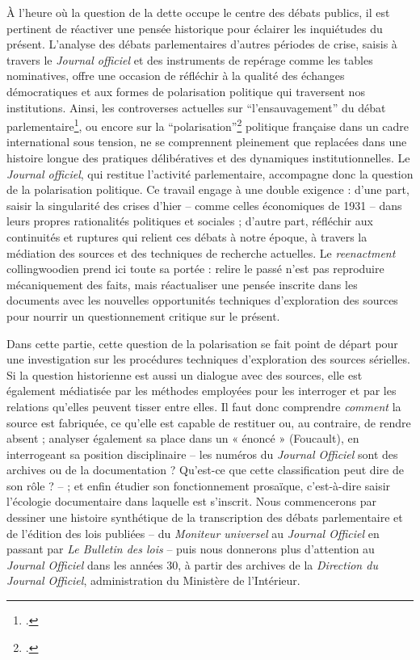 À l’heure où la question de la dette occupe le centre des débats publics, il est pertinent de réactiver une pensée historique pour éclairer les inquiétudes du présent. L’analyse des débats parlementaires d’autres périodes de crise, saisis à travers le \emph{Journal officiel} et des instruments de repérage comme les tables nominatives, offre une occasion de réfléchir à la qualité des échanges démocratiques et aux formes de polarisation politique qui traversent nos institutions. Ainsi, les controverses actuelles sur \enquote{l’ensauvagement} du débat parlementaire\footcite[][]{ensauvagement}, ou encore sur la \enquote{polarisation}\footcite[][]{polarisation} politique française dans un cadre international sous tension, ne se comprennent pleinement que replacées dans une histoire longue des pratiques délibératives et des dynamiques institutionnelles. Le \emph{Journal officiel}, qui restitue l'activité parlementaire, accompagne donc la question de la polarisation politique. Ce travail engage à une double exigence : d’une part, saisir la singularité des crises d’hier -- comme celles économiques de 1931 -- dans leurs propres rationalités politiques et sociales ; d’autre part, réfléchir aux continuités et ruptures qui relient ces débats à notre époque, à travers la médiation des sources et des techniques de recherche actuelles. Le \emph{reenactment} collingwoodien prend ici toute sa portée : relire le passé n’est pas reproduire mécaniquement des faits, mais réactualiser une pensée inscrite dans les documents avec les nouvelles opportunités techniques d'exploration des sources pour nourrir un questionnement critique sur le présent.

Dans cette partie, cette question de la polarisation se fait point de départ pour une investigation sur les procédures techniques d’exploration des sources sérielles. Si la question historienne est aussi un dialogue avec des sources, elle est également médiatisée par les méthodes employées pour les interroger et par les relations qu’elles peuvent tisser entre elles. Il faut donc comprendre \emph{comment} la source est fabriquée, ce qu’elle est capable de restituer ou, au contraire, de rendre absent ; analyser également sa place dans un « énoncé » (Foucault), en interrogeant sa position disciplinaire -- les numéros du \emph{Journal Officiel} sont des archives ou de la documentation ? Qu'est-ce que cette classification peut dire de son rôle ? -- ; et enfin étudier son fonctionnement prosaïque, c’est-à-dire saisir l’écologie documentaire dans laquelle est s'inscrit. Nous commencerons par dessiner une histoire synthétique de la transcription des débats parlementaire et de l'édition des lois publiées -- du \emph{Moniteur universel} au \emph{Journal Officiel} en passant par \emph{Le Bulletin des lois} -- puis nous donnerons plus d'attention au \emph{Journal Officiel} dans les années 30, à partir des archives de la \emph{Direction du Journal Officiel}, administration du Ministère de l'Intérieur.

